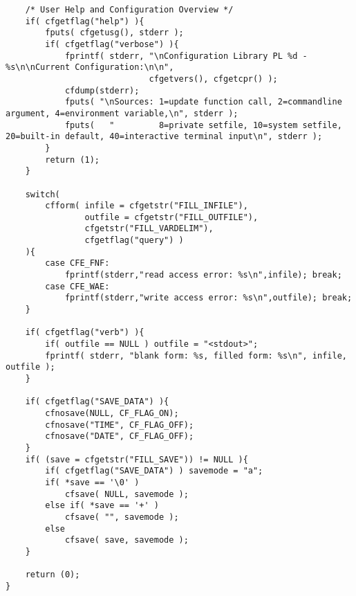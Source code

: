 \begin{DocInclude}
\begin{verbatim}
    /* User Help and Configuration Overview */
    if( cfgetflag("help") ){
        fputs( cfgetusg(), stderr );
        if( cfgetflag("verbose") ){
            fprintf( stderr, "\nConfiguration Library PL %d - %s\n\nCurrent Configuration:\n\n",
                             cfgetvers(), cfgetcpr() );
            cfdump(stderr);
            fputs( "\nSources: 1=update function call, 2=commandline argument, 4=environment variable,\n", stderr );
            fputs(   "         8=private setfile, 10=system setfile, 20=built-in default, 40=interactive terminal input\n", stderr );
        }
        return (1);
    }

    switch(
        cfform( infile = cfgetstr("FILL_INFILE"),
                outfile = cfgetstr("FILL_OUTFILE"),
                cfgetstr("FILL_VARDELIM"),
                cfgetflag("query") )
    ){
        case CFE_FNF:
            fprintf(stderr,"read access error: %s\n",infile); break;
        case CFE_WAE:
            fprintf(stderr,"write access error: %s\n",outfile); break;
    }

    if( cfgetflag("verb") ){
        if( outfile == NULL ) outfile = "<stdout>";
        fprintf( stderr, "blank form: %s, filled form: %s\n", infile, outfile );
    }

    if( cfgetflag("SAVE_DATA") ){
        cfnosave(NULL, CF_FLAG_ON);
        cfnosave("TIME", CF_FLAG_OFF);
        cfnosave("DATE", CF_FLAG_OFF);
    }
    if( (save = cfgetstr("FILL_SAVE")) != NULL ){
        if( cfgetflag("SAVE_DATA") ) savemode = "a";
        if( *save == '\0' )
            cfsave( NULL, savemode );
        else if( *save == '+' )
            cfsave( "", savemode );
        else
            cfsave( save, savemode );
    }

    return (0);
}
\end{verbatim}
\end{DocInclude}
 